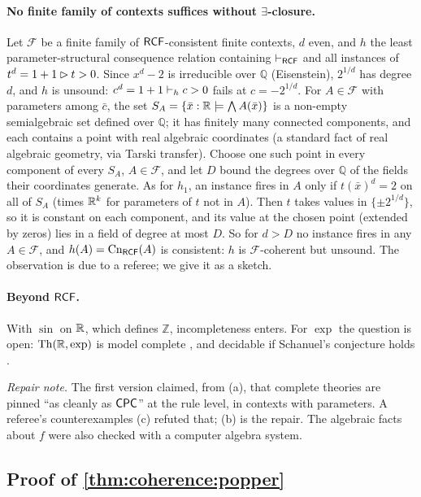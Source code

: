\paragraph{No finite family of contexts suffices without $\exists$-closure.}  Let $\mathcal F$ be a finite family of $\mathsf{RCF}$-consistent finite contexts, $d$ even, and $h$ the least parameter-structural consequence relation containing $\vdash_{\mathsf{RCF}}$ and all instances of $t^d=1+1\rhd t>0$. Since $x^d-2$ is irreducible over $\mathbb Q$ (Eisenstein), $2^{1/d}$ has degree $d$, and $h$ is unsound: $c^d=1+1\vdash_hc>0$ fails at $c=-2^{1/d}$. For $A\in\mathcal F$ with parameters among $\bar c$, the set $S_A=\{\bar x:\mathbb{R}\models\bigwedge A(\bar x)\}$ is a non-empty semialgebraic set defined over $\mathbb Q$; it has finitely many connected components, and each contains a point with real algebraic coordinates (a standard fact of real algebraic geometry, via Tarski transfer). Choose one such point in every component of every $S_A$, $A\in\mathcal F$, and let $D$ bound the degrees over $\mathbb Q$ of the fields their coordinates generate. As for $h_1$, an instance fires in $A$ only if $t(\bar x)^d=2$ on all of $S_A$ (times $\mathbb{R}^k$ for parameters of $t$ not in $A$). Then $t$ takes values in $\{\pm2^{1/d}\}$, so it is constant on each component, and its value at the chosen point (extended by zeros) lies in a field of degree at most $D$. So for $d>D$ no instance fires in any $A\in\mathcal F$, and $h(A)=\mathrm{Cn}_{\mathsf{RCF}}(A)$ is consistent: $h$ is $\mathcal F$-coherent but unsound. The observation is due to a referee; we give it as a sketch.

\paragraph{Beyond $\mathsf{RCF}$.} With $\sin$ on $\mathbb{R}$, which defines $\mathbb Z$, incompleteness enters. For $\exp$ the question is open: $\mathrm{Th}(\mathbb{R},\exp)$ is model complete \citep{wilkie1996model}, and decidable if Schanuel's conjecture holds \citep{macintyre1996decidability}.

\emph{Repair note.} The first version claimed, from (a), that complete theories are pinned ``as cleanly as $\mathsf{CPC}$'' at the rule level, in contexts with parameters. A referee's counterexamples (c) refuted that; (b) is the repair. The algebraic facts about $f$ were also checked with a computer algebra system.

\subsection{Proof of \texorpdfstring{\cref{thm:coherence:popper}}{the Popperian theorem}}\label{app:coherence:popper}

